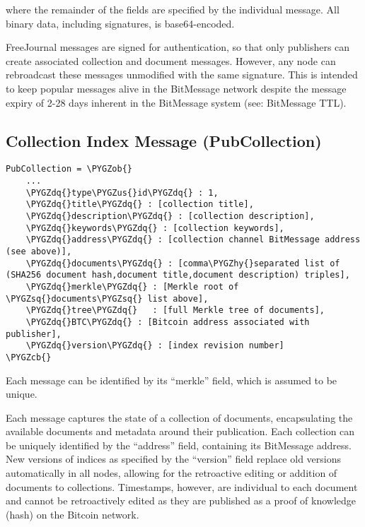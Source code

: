 \documentclass[letterpaper,10pt,oneside]{sphinxmanual}
\def\PYGZus{\char`\_}
\def\PYGZob{\char`\{}
\def\PYGZcb{\char`\}}
\def\PYGZhy{\char`\-}
\def\PYGZsq{\char`\'}
\def\PYGZdq{\char`\"}
\renewcommand\PYGZsq{\textquotesingle}
\begin{document}
where the remainder of the fields are specified by the individual message.  All binary data, including signatures, is
base64-encoded.

FreeJournal messages are signed for authentication, so that only publishers can create associated collection and document
messages.  However, any node can rebroadcast these messages unmodified with the same signature.  This is intended to keep
popular messages alive in the BitMessage network despite the message expiry of 2-28 days inherent in the BitMessage system (see:
BitMessage TTL).


\subsection{Collection Index Message (PubCollection)}
\label{protocol:collection-index-message-pubcollection}
\begin{Verbatim}[commandchars=\\\{\}]
PubCollection = \PYGZob{}
    ...
    \PYGZdq{}type\PYGZus{}id\PYGZdq{} : 1,
    \PYGZdq{}title\PYGZdq{} : [collection title],
    \PYGZdq{}description\PYGZdq{} : [collection description],
    \PYGZdq{}keywords\PYGZdq{} : [collection keywords],
    \PYGZdq{}address\PYGZdq{} : [collection channel BitMessage address (see above)],
    \PYGZdq{}documents\PYGZdq{} : [comma\PYGZhy{}separated list of (SHA256 document hash,document title,document description) triples],
    \PYGZdq{}merkle\PYGZdq{} : [Merkle root of \PYGZsq{}documents\PYGZsq{} list above],
    \PYGZdq{}tree\PYGZdq{}   : [full Merkle tree of documents],
    \PYGZdq{}BTC\PYGZdq{} : [Bitcoin address associated with publisher],
    \PYGZdq{}version\PYGZdq{} : [index revision number]
\PYGZcb{}
\end{Verbatim}

Each message can be identified by its ``merkle'' field, which is assumed to be unique.

Each message captures the state of a collection of documents, encapsulating the available documents and metadata around their
publication.  Each collection can be uniquely identified by the ``address'' field, containing its BitMessage address.  New
versions of indices as specified by the ``version'' field replace old versions automatically in all nodes, allowing for the
retroactive editing or addition of documents to collections.  Timestamps, however, are individual to each document and cannot be
retroactively edited as they are published as a proof of knowledge (hash) on the Bitcoin network.
\end{document}
